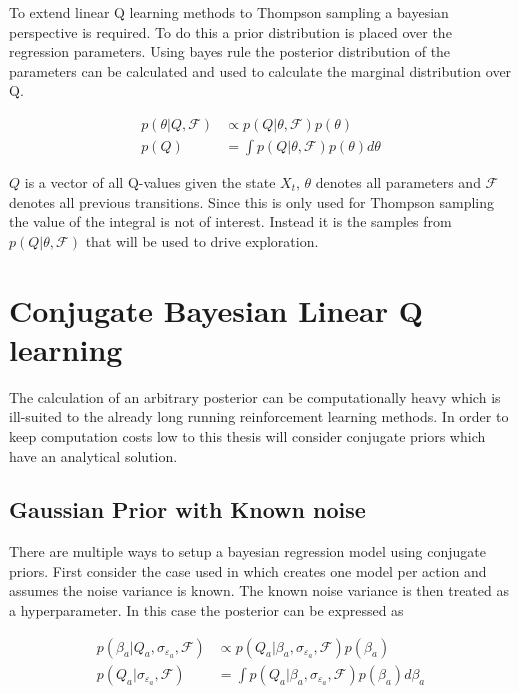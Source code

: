 To extend linear Q learning methods to Thompson sampling a bayesian perspective is required. To do this a prior distribution is placed over the regression parameters. Using bayes rule the posterior distribution of the parameters can be calculated and used to calculate the marginal distribution over Q.

\begin{align*}
p(\theta |Q, \mathcal{F}) &\propto p(Q| \theta, \mathcal{F})p(\theta) \\
p(Q) &= \int p(Q|\theta, \mathcal{F}) p(\theta) d\theta
\end{align*}

$Q$ is a vector of all Q-values given the state $X_t$, $\theta$ denotes all parameters and $\mathcal{F}$ denotes all previous transitions. Since this is only used for Thompson sampling the value of the integral is not of interest. Instead it is the samples from $p(Q|\theta, \mathcal{F})$ that will be used to drive exploration.

\section{Conjugate Bayesian Linear Q learning}

The calculation of an arbitrary posterior can be computationally heavy which is ill-suited to the already long running reinforcement learning methods. In order to keep computation costs low to this thesis will consider conjugate priors which have an analytical solution.

\subsection{Gaussian Prior with Known noise}

There are multiple ways to setup a bayesian regression model using conjugate priors. First consider the case used in \cite{azziz_2018} which creates one model per action and assumes the noise variance is known. The known noise variance is then treated as a hyperparameter. In this case the posterior can be expressed as 

\begin{align*}
    p(\beta_a |Q_a, \sigma_{\varepsilon_a}, \mathcal{F}) &\propto p(Q_a| \beta_a, \sigma_{\varepsilon_a}, \mathcal{F})p(\beta_a) \\
    p(Q_a|\sigma_{\varepsilon_a}, \mathcal{F}) &= \int p(Q_a|\beta_a, \sigma_{\varepsilon_a}, \mathcal{F}) p(\beta_a)d\beta_a
\end{align*}


